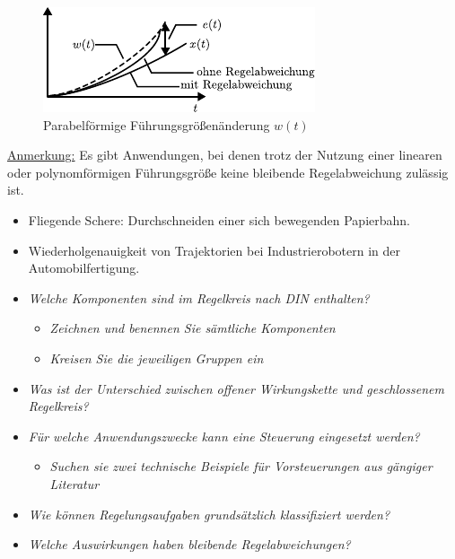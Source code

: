 %
\begin{figure}[h]
	\centering
	\includegraphics[width=0.65\linewidth]{Abbildungen/Grundbegriffe/PDF/Parabelfunktion.pdf}
	\caption{Parabelförmige Führungsgrößenänderung $w(t)$}
	\label{fig:parabelfunktion}
\end{figure}
%
\underline{Anmerkung:} Es gibt Anwendungen, bei denen trotz der Nutzung einer linearen oder polynomförmigen Führungsgröße keine bleibende Regelabweichung zulässig ist.  
\begin{itemize}
	\item Fliegende Schere: Durchschneiden einer sich bewegenden Papierbahn.
	\item Wiederholgenauigkeit von Trajektorien bei Industrierobotern in der Automobilfertigung.
\end{itemize}
%
\begin{Summary}{}{}
	\begin{itemize}
	\item \textit{Welche Komponenten sind im Regelkreis nach DIN enthalten?}
	\begin{itemize}
		\item \textit{Zeichnen und benennen Sie sämtliche Komponenten}
		\item \textit{Kreisen Sie die jeweiligen Gruppen ein}
	\end{itemize}
	\item \textit{Was ist der Unterschied zwischen offener Wirkungskette und geschlossenem Regelkreis?}
	\item \textit{Für welche Anwendungszwecke kann eine Steuerung eingesetzt werden?}
	\begin{itemize}
		\item \textit{Suchen sie zwei technische Beispiele für Vorsteuerungen aus gängiger Literatur}
	\end{itemize}
	\item \textit{Wie können Regelungsaufgaben grundsätzlich klassifiziert werden?}
	\item \textit{Welche Auswirkungen haben bleibende Regelabweichungen?}
	\end{itemize}
\end{Summary}
%
